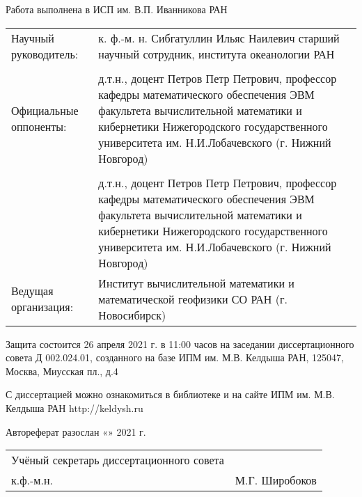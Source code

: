 \documentclass[utf8x]{G7-32} %
\begin{document}
\newpage
\begin{spacing}{1.2}
\pagestyle{empty}
\begin{flushleft}
  Работа выполнена в ИСП им. В.П. Иванникова РАН
\end{flushleft}

\begin{flushleft}
\begin{tabular}{p{5.8cm} p{10.5cm}}
    Научный руководитель: & к. ф.-м. н. Сибгатуллин Ильяс Наилевич старший научный сотрудник, института океанологии РАН  \\

    \\

    Официальные оппоненты: & д.т.н., доцент Петров Петр Петрович, профессор кафедры математического обеспечения ЭВМ факультета вычислительной математики и кибернетики Нижегородского государственного университета им. Н.И.Лобачевского (г. Нижний Новгород)\\

    \\

    & д.т.н., доцент Петров Петр Петрович, профессор кафедры математического обеспечения ЭВМ факультета вычислительной математики и кибернетики Нижегородского государственного университета им. Н.И.Лобачевского (г. Нижний Новгород)
    
    \\

    Ведущая организация: & Институт вычислительной математики и математической геофизики СО РАН (г. Новосибирск)
    
\end{tabular}
\end{flushleft}

\begin{flushleft}
    Защита состоится 26 апреля 2021 г. в 11:00 часов на заседании диссертационного совета Д 002.024.01, созданного на базе ИПМ им. М.В. Келдыша РАН, 125047, Москва, Миусская пл., д.4

    \setlength{\parskip}{1em}

    С диссертацией можно ознакомиться в библиотеке и на сайте ИПМ им. М.В. Келдыша РАН http://keldysh.ru 

    \setlength{\parskip}{1em}

    Автореферат разослан «\underline{\hspace{1cm}}» \underline{\hspace{4cm}} 2021 г.    
\end{flushleft}

\setlength{\parskip}{1em}

\begin{flushleft}
    \begin{tabular}{p{10cm} p{5cm}}

        Учёный секретарь диссертационного совета \\ к.ф.-м.н.  
    &  М.Г. Широбоков 
        
    \end{tabular}
\end{flushleft}
\end{spacing}
\newpage
\pagestyle{fancy}
\setcounter{page}{3}
\end{document}
